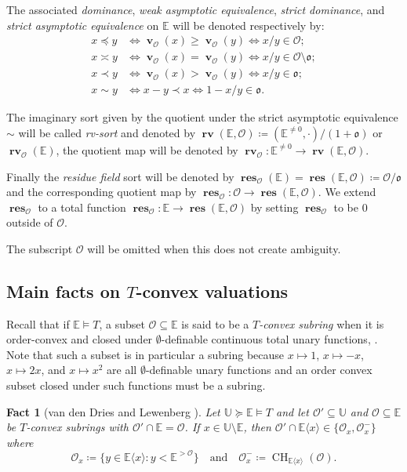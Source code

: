 \documentclass{amsart}
\newtheorem{fact}[theorem]{Fact}
\theoremstyle{remark}
\theoremstyle{definition}
\theoremstyle{plain}
\newcommand{\bE}{\mathbb E}
\newcommand{\bU}{\mathbb U}
\newcommand{\cO}{\mathcal O}
\newcommand{\co}{\mathfrak o}
\DeclareMathOperator{\val}{\mathbf{v}}
\DeclareMathOperator{\rv}{\mathbf{rv}}
\DeclareMathOperator{\res}{\mathbf{res}}
\DeclareMathOperator{\CH}{\mathrm{CH}}
\theoremstyle{plain}
\begin{document}
The associated \emph{dominance}, \emph{weak asymptotic equivalence}, \emph{strict dominance}, and \emph{strict asymptotic equivalence} on $\bE$ will be denoted respectively by:
\[\begin{aligned}
x \preceq y &\Longleftrightarrow \val_\cO(x)\ge \val_\cO(y) \Leftrightarrow x/y \in \cO;\\
x \asymp y &\Longleftrightarrow \val_\cO(x)=\val_\cO(y) \Leftrightarrow x/y \in \cO \setminus \co;\\
x \prec y &\Longleftrightarrow \val_\cO(x)>\val_\cO(y) \Leftrightarrow x/y \in \co;\\
x \sim y &\Longleftrightarrow x-y \prec x \Leftrightarrow 1-x/y \in \co.
\end{aligned}\]

The imaginary sort given by the quotient under the strict asymptotic equivalence $\sim$ will be called \emph{rv-sort} and denoted by $\rv(\bE, \cO)\coloneqq(\bE^{\neq0}, \cdot)/(1+\co)$ or $\rv_\cO(\bE)$, the quotient map will be denoted by $\rv_\cO: \bE^{\neq 0} \to \rv(\bE, \cO)$.

Finally the \emph{residue field} sort will be denoted by $\res_{\cO}(\bE)=\res(\bE,\cO)\coloneqq\cO/\co$ and the corresponding quotient map by $\res_\cO: \cO \to \res(\bE,\cO)$. We extend $\res_\cO$ to a total function $\res_\cO: \bE \to \res(\bE,\cO)$ by setting $\res_\cO$ to be $0$ outside of $\cO$.

The subscript $\cO$ will be omitted when this does not create ambiguity.

\subsection{Main facts on \texorpdfstring{$T$}{T}-convex valuations}
Recall that if $\bE \models T$, a subset $\cO \subseteq \bE$ is said to be a \emph{$T$-convex subring} when it is order-convex and closed under $\emptyset$-definable continuous total unary functions, \cite[2.7]{dries1995t}. Note that such a subset is in particular a subring because $x\mapsto 1$, $x\mapsto -x$, $x\mapsto 2x$, and $x\mapsto x^2$ are all $\emptyset$-definable unary functions and an order convex subset closed under such functions must be a subring.

\begin{fact}[{van den Dries and  Lewenberg \cite[3.6 and 3.7]{dries1995t}}]\label{fact:unary_type_extension_alternative}
    Let $\bU \succeq \bE \models T$ and let $\cO'\subseteq \bU$ and $\cO \subseteq \bE$ be $T$-convex subrings with $\cO'\cap \bE= \cO$. If $x \in \bU \setminus \bE$, then $\cO' \cap \bE \langle x \rangle \in \{\cO_x, \cO_x^-\}$ where
    \[\cO_x\coloneqq\{y \in \bE \langle x \rangle: y<\bE^{>\cO}\} \quad \text{and} \quad \cO_x^-\coloneqq\CH_{\bE \langle x \rangle}(\cO).\]
\end{fact}
\end{document}
